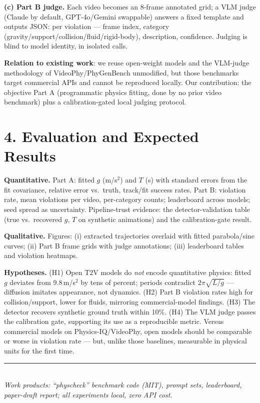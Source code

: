 \documentclass[10pt,a4paper]{article}
\begin{document}
\textbf{(c) Part B judge.} Each video becomes an 8-frame annotated grid; a VLM judge
(Claude by default, GPT-4o/Gemini swappable) answers a fixed template and outputs JSON:
per violation --- frame index, category (gravity/support/collision/fluid/rigid-body),
description, confidence. Judging is blind to model identity, in isolated calls.

\textbf{Relation to existing work}: we reuse open-weight models and the VLM-judge
methodology of VideoPhy/PhyGenBench unmodified, but those benchmarks target commercial
APIs and cannot be reproduced locally. Our contribution: the objective Part A
(programmatic physics fitting, done by no prior video benchmark) plus a
calibration-gated local judging protocol.

\section*{4. Evaluation and Expected Results}

\textbf{Quantitative.} Part A: fitted $g$ (m/s$^2$) and $T$ (s) with standard errors from
the fit covariance, relative error vs.\ truth, track/fit success rates. Part B: violation
rate, mean violations per video, per-category counts; leaderboard across models; seed
spread as uncertainty. Pipeline-trust evidence: the detector-validation table (true vs.\
recovered $g$, $T$ on synthetic animations) and the calibration-gate result.

\textbf{Qualitative.} Figures: (i) extracted trajectories overlaid with fitted
parabola/sine curves; (ii) Part B frame grids with judge annotations; (iii) leaderboard
tables and violation heatmaps.

\textbf{Hypotheses.} (H1) Open T2V models do \emph{not} encode quantitative physics:
fitted $g$ deviates from 9.8\,m/s$^2$ by tens of percent; periods contradict
$2\pi\sqrt{L/g}$ --- diffusion imitates appearance, not dynamics. (H2) Part B violation
rates high for collision/support, lower for fluids, mirroring commercial-model findings.
(H3) The detector recovers synthetic ground truth within 10\%. (H4) The VLM judge passes
the calibration gate, supporting its use as a reproducible metric. Versus commercial
models on Physics-IQ/VideoPhy, open models should be comparable or worse in violation
rate --- but, unlike those baselines, measurable in physical units for the first time.

\vspace{2pt}
\noindent\rule{\textwidth}{0.4pt}\\[2pt]
\small\textit{Work products: ``physcheck'' benchmark code (MIT), prompt sets, leaderboard,
paper-draft report; all experiments local, zero API cost.}
\end{document}
